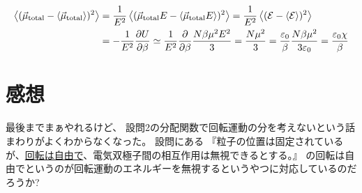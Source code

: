 \documentclass[../../master.tex]{subfiles}
\begin{document}
\section{}
\begin{equation}\begin{aligned}[b]
    \ev{(\vec{\mu}_{\text{total}}-\ev{\vec{\mu}_{\text{total}}})^2}
    &=\frac{1}{E^2}\ev{(\vec{\mu}_{\text{total}}E-\ev{\vec{\mu}_{\text{total}}E})^2}
    =\frac{1}{E^2}\ev{(\mathcal{E}-\ev{\mathcal{E}})^2}\\
    &=-\frac{1}{E^2}\pdv{U}{\beta}
    \simeq \frac{1}{E^2}\pdv{\beta} \frac{N\beta\mu^2E^2}{3}
    = \frac{N\mu^2}{3} = \frac{\varepsilon_0}{\beta}\frac{N\beta\mu^2}{3\varepsilon_0}
    = \frac{\varepsilon_0 \chi}{\beta}
\end{aligned}\end{equation}

\section*{感想}
最後までまぁやれるけど、
設問2の分配関数で回転運動の分を考えないという話まわりがよくわからなくなった。
設問にある
『粒子の位置は固定されているが、\underline{回転は自由で}、電気双極子間の相互作用は無視できるとする。』
の回転は自由でというのが回転運動のエネルギーを無視するというやつに対応しているのだろうか?
\end{document}
